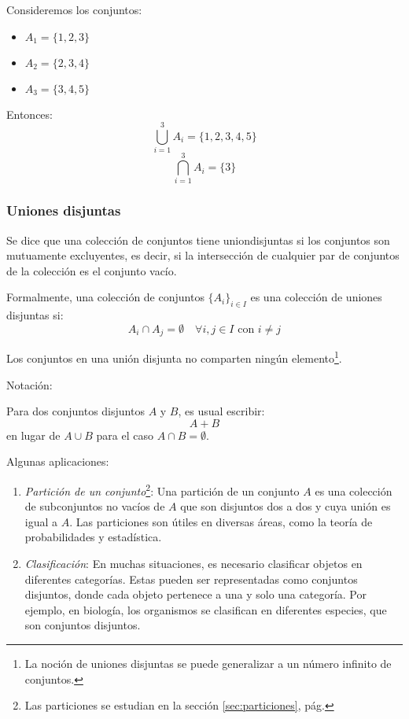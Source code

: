 \begin{fmd-example}
	Consideremos los conjuntos:
	\begin{itemize}[itemsep=0pt]
		\item \(A_1 = \{1, 2, 3\}\)
		\item \(A_2 = \{2, 3, 4\}\)
		\item \(A_3 = \{3, 4, 5\}\)
	\end{itemize}
	Entonces:
	\[\bigcup_{i=1}^{3} A_i = \{1, 2, 3, 4, 5\}\]
	\[\bigcap_{i=1}^{3} A_i = \{3\}\]
\end{fmd-example}

\subsubsection{Uniones disjuntas}
\vspace{1em}
\begin{fmd-definition}
	Se dice que una colección de conjuntos tiene \glspl{uniondisjunta} si los conjuntos son mutuamente excluyentes, es decir, si la intersección de cualquier par de conjuntos de la colección es el conjunto vacío.
	
	Formalmente, una colección de conjuntos \(\{A_i\}_{i \in I}\) es una colección de uniones disjuntas si:
	\[A_i \cap A_j = \emptyset \quad \forall i, j \in I \mbox{ con } i \neq j\]
	
	Los conjuntos en una unión disjunta no comparten ningún elemento\footnote{La noción de uniones disjuntas se puede generalizar a un número infinito de conjuntos.}.
	
	Notación:
	
	Para dos conjuntos disjuntos $A$ y $B$, es usual escribir:
	\[ A + B \]
	en lugar de $A \cup B$ para el caso $A \cap B = \emptyset$.
\end{fmd-definition}

Algunas aplicaciones:

\begin{enumerate}
	\item \textit{Partición de un conjunto}\footnote{Las particiones se estudian en la sección \ref{sec:particiones}, pág. \pageref{sec:particiones}}: Una partición de un conjunto \(A\) es una colección de subconjuntos no vacíos de \(A\) que son disjuntos dos a dos y cuya unión es igual a \(A\).  Las particiones son útiles en diversas áreas, como la teoría de probabilidades y estadística.
	
	\item \textit{Clasificación}: En muchas situaciones, es necesario clasificar objetos en diferentes categorías. Estas pueden ser representadas como conjuntos disjuntos, donde cada objeto pertenece a una y solo una categoría. Por ejemplo, en biología, los organismos se clasifican en diferentes especies, que son conjuntos disjuntos.
\end{enumerate}

